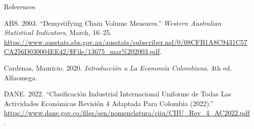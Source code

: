 \documentclass[
  ignorenonframetext,
]{beamer}
\newlength{\cslhangindent}
\newenvironment{CSLReferences}[2] %
 {\begin{list}{}{%
  \setlength{\itemindent}{0pt}
  \setlength{\leftmargin}{0pt}
  \setlength{\parsep}{0pt}
  \ifodd #1
   \setlength{\leftmargin}{\cslhangindent}
   \setlength{\itemindent}{-1\cslhangindent}
  \fi
  \setlength{\itemsep}{#2\baselineskip}}}
 {\end{list}}
\begin{document}
\begin{frame}[allowframebreaks]{References}
\label{refs}
\begin{CSLReferences}{1}{0}
ABS. 2003. {``Demystifying {Chain} {Volume} {Measures}.''} \emph{Western
Australian Statistical Indicators}, March, 16--25.
\url{https://www.ausstats.abs.gov.au/ausstats/subscriber.nsf/0/08CFB1A8C9431C57CA256D030004EE42/$File/13675_mar\%202003.pdf}.

Cardenas, Mauricio. 2020. \emph{Introducción a La {Economía}
{Colombiana}}. 4th ed. Alfaomega.

DANE. 2022. {``Clasificación {Industrial} {Internacional} {Uniforme} de
Todas Las Actividades Económicas {Revisión} 4 {Adaptada} Para {Colombia}
(2022).''}
\url{https://www.dane.gov.co/files/sen/nomenclatura/ciiu/CIIU_Rev_4_AC2022.pdf}.

\end{CSLReferences}
\end{frame}
\end{document}
